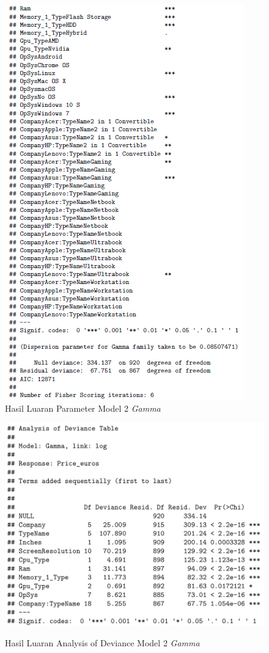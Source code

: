 \documentclass[12pt]{article}
\begin{document}
\begin{figure}[h!]
    \centering
    \includegraphics{Model_3_Sum(3_3).png}
    \caption{Hasil Luaran Parameter Model 2 \textit{Gamma}}
    \label{fig:SUM33}
\end{figure}
\begin{figure}[h!]
    \centering
    \includegraphics{Model_3_AOV.png}
    \label{fig:AOV3}
    \caption{Hasil Luaran Analysis of Deviance Model 2 \textit{Gamma}}
\end{figure}
\end{document}
